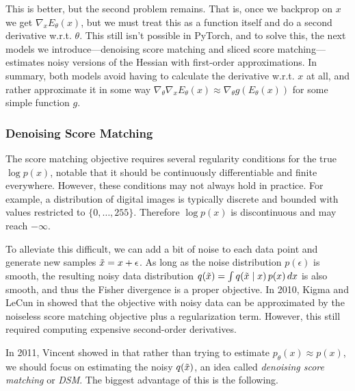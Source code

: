 \documentclass{article}
\begin{document}
    This is better, but the second problem remains. That is, once we backprop on $x$ we get $\nabla_x E_\theta (x)$, but we must treat this as a function itself and do a second derivative w.r.t. $\theta$. This still isn't possible in PyTorch, and to solve this, the next models we introduce---denoising score matching and sliced score matching---estimates noisy versions of the Hessian with first-order approximations. In summary, both models avoid having to calculate the derivative w.r.t. $x$ at all, and rather approximate it in some way $\nabla_\theta \nabla_x E_\theta (x) \approx \nabla_\theta g(E_\theta(x))$ for some simple function $g$. 

  \subsubsection{Denoising Score Matching} 

    The score matching objective requires several regularity conditions for the true $\log p(x)$, notable that it should be continuously differentiable and finite everywhere. However, these conditions may not always hold in practice. For example, a distribution of digital images is typically discrete and bounded with values restricted to $\{0, \ldots, 255\}$. Therefore $\log p(x)$ is discontinuous and may reach $-\infty$. 

    To alleviate this difficult, we can add a bit of noise to each data point and generate new samples $\Tilde{x} = x + \epsilon$. As long as the noise distribution $p(\epsilon)$ is smooth, the resulting noisy data distribution $q(\Tilde{x}) = \int q(\Tilde{x} \mid x) \, p(x) \,dx$ is also smooth, and thus the Fisher divergence is a proper objective. In 2010, Kigma and LeCun in \cite{reg_score} showed that the objective with noisy data can be approximated by the noiseless score matching objective plus a regularization term. However, this still required computing expensive second-order derivatives. 

    In 2011, Vincent showed in \cite{denoise_score} that rather than trying to estimate $p_\theta (x) \approx p(x)$, we should focus on estimating the noisy $q(\Tilde{x})$, an idea called \textit{denoising score matching} or \textit{DSM}. The biggest advantage of this is the following. 
\end{document}
